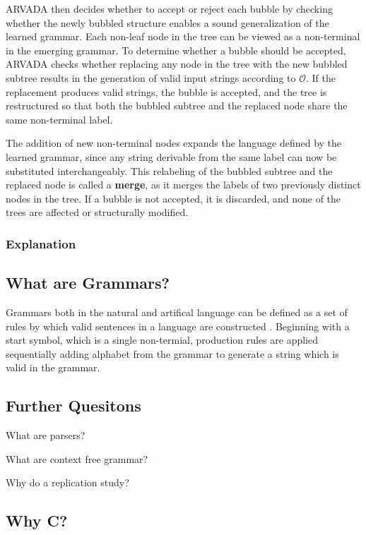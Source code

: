 ARVADA then decides whether to accept or reject each bubble by checking whether the newly bubbled structure enables a sound generalization of the learned grammar. Each non-leaf node in the tree can be viewed as a non-terminal in the emerging grammar. To determine whether a bubble should be accepted, ARVADA checks whether replacing any node in the tree with the new bubbled subtree results in the generation of valid input strings according to $\mathcal{O}$. If the replacement produces valid strings, the bubble is accepted, and the tree is restructured so that both the bubbled subtree and the replaced node share the same non-terminal label.

The addition of new non-terminal nodes expands the language defined by the learned grammar, since any string derivable from the same label can now be substituted interchangeably. This relabeling of the bubbled subtree and the replaced node is called a \textbf{merge}, as it merges the labels of two previously distinct nodes in the tree. If a bubble is not accepted, it is discarded, and none of the trees are affected or structurally modified.

\subsubsection{Explanation}

\subsection{What are Grammars?}

Grammars both in the natural and artifical language can be defined as a set of rules by which valid sentences in a language are constructed \cite{jiangFormalGrammarsLanguages}. Beginning with a start symbol, which is a single non-termial, production rules are applied sequentially adding alphabet from the grammar to generate a string which is valid in the grammar.

\subsection{Further Quesitons}

What are parsers?

What are context free grammar?

Why do a replication study?

\subsection{Why C?}


